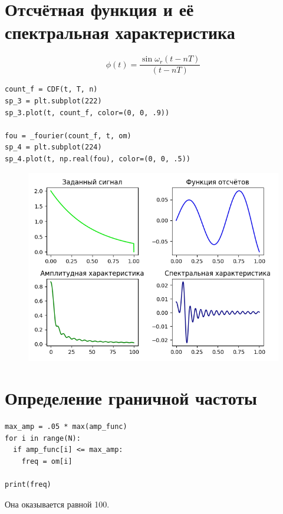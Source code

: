 \documentclass[12pt]{article}
\begin{document}
\begin{figure}[!htb]
\centering
\caption{}
\label{}
\end{figure}

\section{ Отсчётная функция и её спектральная характеристика }

\[\phi(t) = \frac{\sin \omega_r (t-nT)}{(t-nT)} \]


\begin{lstlisting}
count_f = CDF(t, T, n)
sp_3 = plt.subplot(222)
sp_3.plot(t, count_f, color=(0, 0, .9))

fou = _fourier(count_f, t, om)
sp_4 = plt.subplot(224)
sp_4.plot(t, np.real(fou), color=(0, 0, .5))
\end{lstlisting}

\begin{figure}[htp]
\centering
\includegraphics[scale=1.00]{first-group.png}
\caption{}
\label{}
\end{figure}

\section{ Определение граничной частоты }

\begin{lstlisting}
max_amp = .05 * max(amp_func)
for i in range(N):
  if amp_func[i] <= max_amp:
    freq = om[i]

print(freq)
\end{lstlisting}
Она оказывается равной 100.
\end{document}
